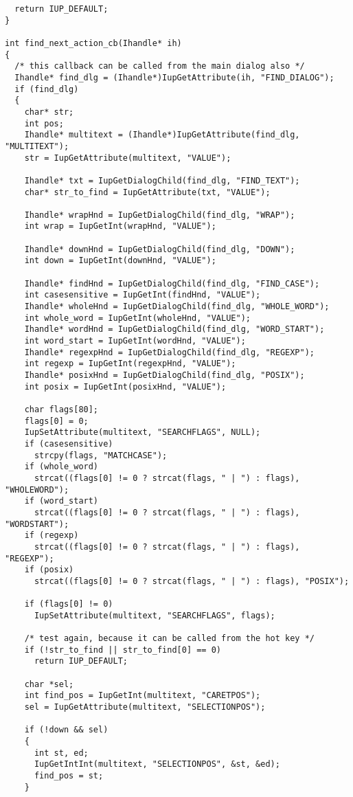 \documentclass{ctexart}
\begin{document}
\begin{lstlisting}
  return IUP_DEFAULT;
}

int find_next_action_cb(Ihandle* ih)
{
  /* this callback can be called from the main dialog also */
  Ihandle* find_dlg = (Ihandle*)IupGetAttribute(ih, "FIND_DIALOG");
  if (find_dlg)
  {
    char* str;
    int pos;
    Ihandle* multitext = (Ihandle*)IupGetAttribute(find_dlg, "MULTITEXT");
    str = IupGetAttribute(multitext, "VALUE");

    Ihandle* txt = IupGetDialogChild(find_dlg, "FIND_TEXT");
    char* str_to_find = IupGetAttribute(txt, "VALUE");

    Ihandle* wrapHnd = IupGetDialogChild(find_dlg, "WRAP");
    int wrap = IupGetInt(wrapHnd, "VALUE");

    Ihandle* downHnd = IupGetDialogChild(find_dlg, "DOWN");
    int down = IupGetInt(downHnd, "VALUE");

    Ihandle* findHnd = IupGetDialogChild(find_dlg, "FIND_CASE");
    int casesensitive = IupGetInt(findHnd, "VALUE");
    Ihandle* wholeHnd = IupGetDialogChild(find_dlg, "WHOLE_WORD");
    int whole_word = IupGetInt(wholeHnd, "VALUE");
    Ihandle* wordHnd = IupGetDialogChild(find_dlg, "WORD_START");
    int word_start = IupGetInt(wordHnd, "VALUE");
    Ihandle* regexpHnd = IupGetDialogChild(find_dlg, "REGEXP");
    int regexp = IupGetInt(regexpHnd, "VALUE");
    Ihandle* posixHnd = IupGetDialogChild(find_dlg, "POSIX");
    int posix = IupGetInt(posixHnd, "VALUE");

    char flags[80];
    flags[0] = 0;
    IupSetAttribute(multitext, "SEARCHFLAGS", NULL);
    if (casesensitive)
      strcpy(flags, "MATCHCASE");
    if (whole_word)
      strcat((flags[0] != 0 ? strcat(flags, " | ") : flags), "WHOLEWORD");
    if (word_start)
      strcat((flags[0] != 0 ? strcat(flags, " | ") : flags), "WORDSTART");
    if (regexp)
      strcat((flags[0] != 0 ? strcat(flags, " | ") : flags), "REGEXP");
    if (posix)
      strcat((flags[0] != 0 ? strcat(flags, " | ") : flags), "POSIX");

    if (flags[0] != 0)
      IupSetAttribute(multitext, "SEARCHFLAGS", flags);

    /* test again, because it can be called from the hot key */
    if (!str_to_find || str_to_find[0] == 0)
      return IUP_DEFAULT;

    char *sel;
    int find_pos = IupGetInt(multitext, "CARETPOS");
    sel = IupGetAttribute(multitext, "SELECTIONPOS");

    if (!down && sel)
    {
      int st, ed;
      IupGetIntInt(multitext, "SELECTIONPOS", &st, &ed);
      find_pos = st;
    }


\end{lstlisting}
\end{document}

